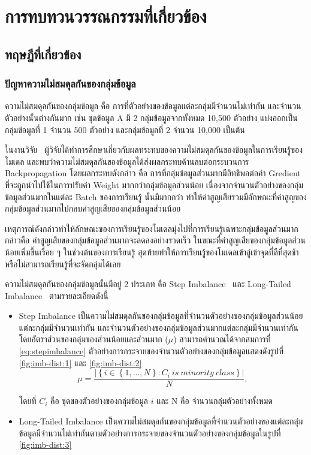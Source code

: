 \chapter{การทบทวนวรรณกรรมที่เกี่ยวข้อง}
\label{chapter:literature-review}

\section{ทฤษฎีที่เกี่ยวข้อง}
\subsection{ปัญหาความไม่สมดุลกันของกลุ่มข้อมูล}
ความไม่สมดุลกันของกลุ่มข้อมูล คือ การที่ตัวอย่างของข้อมูลแต่ละกลุ่มมีจำนวนไม่เท่ากัน และจำนวนตัวอย่างนั้นต่างกันมาก เช่น ชุดข้อมูล A มี 2 กลุ่มข้อมูลจากทั้งหมด 10,500 ตัวอย่าง 
แบ่งออกเป็นกลุ่มข้อมูลที่ 1 จำนวน 500 ตัวอย่าง และกลุ่มข้อมูลที่ 2 จำนวน 10,000 เป็นต้น 

ในงานวิจัย~\cite{Anand:1993} ผู้วิจัยได้ทำการศึกษาเกี่ยวกับผลทระทบของความไม่สมดุลกันของข้อมูลในการเรียนรู้ของโมเดล และพบว่าความไม่สมดุลกันของข้อมูลได้ส่งผลกระทบด้านลบต่อกระบวนการ Backpropagation โดยผลกระทบดังกล่าว คือ การที่กลุ่มข้อมูลส่วนมากมีอิทธิพลต่อค่า Gredient ที่จะถูกนำไปใช้ในการปรับค่า Weight มากกว่ากลุ่มข้อมูลส่วนน้อย เนื่องจากจำนวนตัวอย่างของกลุ่มข้อมูลส่วนมากในแต่ละ Batch ของการเรียนรู้ นั้นมีมากกว่า ทำให้ค่าสูญเสียรวมมีลักษณะที่ค่าสูญของกลุ่มข้อมูลส่วนมากไปกลบค่าสูญเสียของกลุ่มข้อมูลส่วนน้อย 

เหตุการณ์ดังกล่าวทำให้ลักษณะของการเรียนรู้ของโมเดลมุ่งไปที่การเรียนรู้เฉพาะกลุ่มข้อมูลส่วนมาก  กล่าวคือ ค่าสูญเสียของกลุ่มข้อมูลส่วนมากจะลดลงอย่างรวดเร็ว ในขณะที่ค่าสูญเสียของกลุ่มข้อมูลส่วนน้อยเพิ่มขึ้นเรื่อย ๆ ในช่วงต้นของการเรียนรู้ สุดท้ายทำให้การเรียนรู้ของโมเดลเข้าลู่เข้าจุดที่ดีที่สุดช้าหรือไม่สามารถเรียนรู้ที่จะจัดกลุ่มได้เลย

ความไม่สมดุลกันของกลุ่มข้อมูลนั้นมีอยู่ 2 ประเภท คือ Step Imbalance~\cite{Buda:2017} และ Long-Tailed Imbalance~\cite{Liu:2019} ตามรายละเอียดดังนี้

\begin{itemize}
  \item Step Imbalance เป็นความไม่สมดุลกันของกลุ่มข้อมูลที่จำนวนตัวอย่างของกลุ่มข้อมูลส่วนน้อยแต่ละกลุ่มมีจำนวนเท่ากัน และจำนวนตัวอย่างของกลุ่มข้อมูลส่วนมากแต่ละกลุ่มมีจำนวนเท่ากัน โดยอัตราส่วนของกลุ่มของส่วนน้อยและส่วนมาก ($\mu$) สามารถคำนวณได้จากสมการที่ \ref{eq:stepimbalance} ตัวอย่างการกระจายของจำนวนตัวอย่างของกลุ่มข้อมูลแสดงดังรูปที่ \ref{fig:imb-dist:1} และ \ref{fig:imb-dist:2} 
  \begin{equation}
      \mu = \frac{\left | \left \{ i\in  \left \{ 1,...,N \right \}: C_{i}\:is\:minority\:class \right \} \right |}{N},
      \label{eq:stepimbalance}
    \end{equation}

    โดยที่ $C_{i}$ คือ ชุดของตัวอย่างของกลุ่มข้อมูล $i$ และ N คือ จำนวนกลุ่มตัวอย่างทั้งหมด
  \item Long-Tailed Imbalance เป็นความไม่สมดุลกันของกลุ่มข้อมูลที่จำนวนตัวอย่างของแต่ละกลุ่มข้อมูลมีจำนวนไม่เท่ากันตามตัวอย่างการกระจายของจำนวนตัวอย่างของกลุ่มข้อมูลในรูปที่ \ref{fig:imb-dist:3}
  
\end{itemize}

